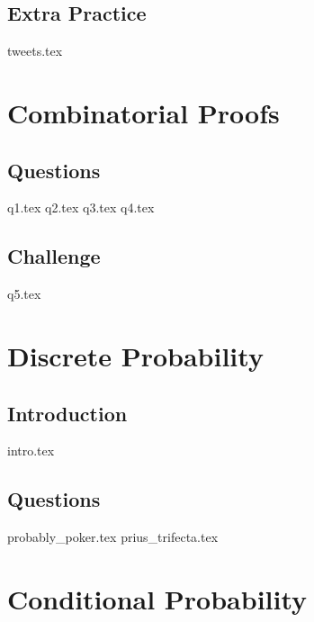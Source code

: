 \documentclass{exam}
\begin{document}
\subsection{Extra Practice}
\begin{questions}
{tweets.tex}
\end{questions}

\section{Combinatorial Proofs}
\subsection{Questions}
\begin{questions}
{q1.tex}
{q2.tex}
{q3.tex}
{q4.tex}
\end{questions}
\subsection{Challenge}
\begin{questions}
{q5.tex}
\end{questions}

\section{Discrete Probability}
\subsection{Introduction}
{intro.tex}
\subsection{Questions}
\begin{questions}
{probably_poker.tex}
{prius_trifecta.tex}
\end{questions}

\section{Conditional Probability}
\end{document}
